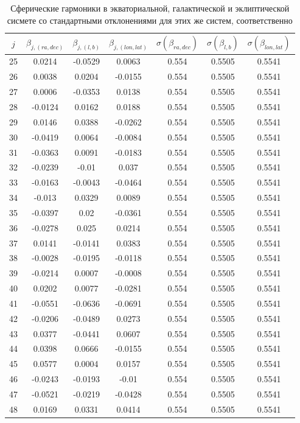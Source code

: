 \documentclass[14pt]{article} %
\begin{document}
\begin{spacing}{1.0}
\newpage

\begin{table}[h!]
\centering
\caption{Сферические гармоники в экваториальной, галактической и эклиптической сисмете со стандартными отклонениями для этих же систем, соответственно}
\label{tabular:sf_all2}
\begin{tabular}{|c|c|c|c|c|c|c|}
\hline 	
$j$ &$\beta_{j,(ra,dec)}$ &$\beta_{j,(l,b)}$ &$\beta_{j,(lon,lat)}$ &$\sigma(\beta_{ra,dec})$ &$\sigma(\beta_{l,b})$ & $\sigma(\beta_{lon,lat})$\\
\hline 
25 &0.0214 &-0.0529 &0.0063 &0.554 &0.5505 &0.5541\\
26 &0.0038 &0.0204 &-0.0155 &0.554 &0.5505 &0.5541\\
27 &0.0006 &-0.0353 &0.0138 &0.554 &0.5505 &0.5541\\
28 &-0.0124 &0.0162 &0.0188 &0.554 &0.5505 &0.5541\\
29 &0.0146 &0.0388 &-0.0262 &0.554 &0.5505 &0.5541\\
30 &-0.0419 &0.0064 &-0.0084 &0.554 &0.5505 &0.5541\\
31 &-0.0363 &0.0091 &-0.0183 &0.554 &0.5505 &0.5541\\
32 &-0.0239 &-0.01 &0.037 &0.554 &0.5505 &0.5541\\
33 &-0.0163 &-0.0043 &-0.0464 &0.554 &0.5505 &0.5541\\
34 &-0.013 &0.0329 &0.0089 &0.554 &0.5505 &0.5541\\
35 &-0.0397 &0.02 &-0.0361 &0.554 &0.5505 &0.5541\\
36 &-0.0278 &0.025 &0.0214 &0.554 &0.5505 &0.5541\\
37 &0.0141 &-0.0141 &0.0383 &0.554 &0.5505 &0.5541\\
38 &-0.0028 &-0.0195 &-0.0118 &0.554 &0.5505 &0.5541\\
39 &-0.0214 &0.0007 &-0.0008 &0.554 &0.5505 &0.5541\\
40 &0.0202 &0.0077 &-0.0281 &0.554 &0.5505 &0.5541\\
41 &-0.0551 &-0.0636 &-0.0691 &0.554 &0.5505 &0.5541\\
42 &-0.0206 &-0.0489 &0.0273 &0.554 &0.5505 &0.5541\\
43 &0.0377 &-0.0441 &0.0607 &0.554 &0.5505 &0.5541\\
44 &0.0398 &0.0666 &-0.0155 &0.554 &0.5505 &0.5541\\
45 &0.0577 &0.0004 &0.0157 &0.554 &0.5505 &0.5541\\
46 &-0.0243 &-0.0193 &-0.01 &0.554 &0.5505 &0.5541\\
47 &-0.0521 &-0.0219 &-0.0428 &0.554 &0.5505 &0.5541\\
48 &0.0169 &0.0331 &0.0414 &0.554 &0.5505 &0.5541\\
\hline 
\end{tabular}
\end{table}
\end{spacing}
\end{document}

